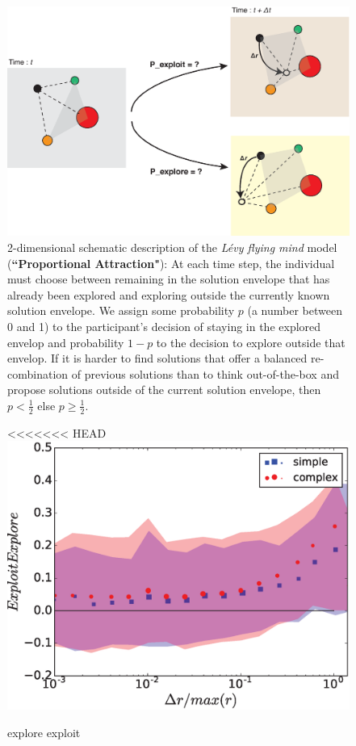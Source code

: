 \begin{figure}[h!]
\begin{center}
\includegraphics[width=12cm]{figures/schematic_displacement.eps}
\caption{2-dimensional schematic description of the {\it L\'evy flying mind} model ({\bf ``Proportional Attraction"}): At each time step, the individual must choose between remaining in the solution envelope that has already been explored and exploring outside the currently known solution envelope.  We assign some probability $p$ (a number between 0 and 1) to the participant's decision of staying in the explored envelop and probability $1-p$ to the decision to explore outside that envelop.  If it is harder to find solutions that offer a balanced re-combination of previous solutions than to think out-of-the-box and propose solutions outside of the current solution envelope, then $p < \frac{1}{2}$ else $p \geq \frac{1}{2}$.}
\label{fig:schematic}
\end{center}
\end{figure}

\begin{figure}[h!]
\begin{center}
<<<<<<< HEAD
\includegraphics[width=13cm]{figures/EE_vs_Dr.eps}
\caption{explore exploit}
\label{fig:exploit_explore}
\end{center}
\end{figure}



